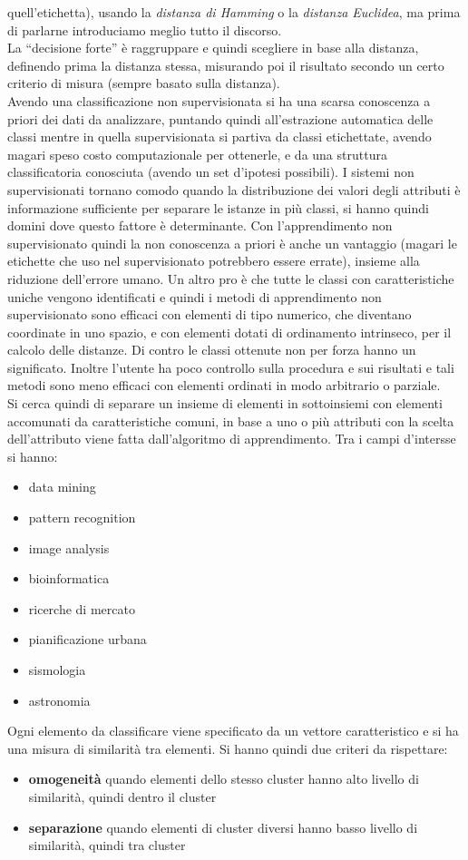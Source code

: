 quell'etichetta), usando la \textit{distanza di Hamming} o la \textit{distanza
  Euclidea}, ma prima di parlarne introduciamo meglio tutto il discorso. \\
La ``decisione forte'' è raggruppare e quindi scegliere in base alla distanza,
definendo prima la distanza stessa, misurando poi il risultato secondo un certo
criterio di misura (sempre basato sulla distanza).\\
Avendo una classificazione non supervisionata si ha una scarsa conoscenza a
priori dei dati da analizzare, puntando quindi all'estrazione automatica delle
classi mentre in quella supervisionata si partiva da classi etichettate, avendo
magari speso costo computazionale per ottenerle, e da una struttura
classificatoria conosciuta (avendo un set d'ipotesi possibili). I sistemi non
supervisionati tornano comodo quando la distribuzione dei valori degli attributi
è informazione sufficiente per separare le istanze in più classi, si hanno
quindi domini dove questo fattore è determinante. Con l'apprendimento non
supervisionato quindi la non conoscenza a priori è anche un vantaggio (magari le
etichette che uso nel supervisionato potrebbero essere errate), insieme
alla riduzione dell'errore umano. Un altro pro è che tutte le classi con
caratteristiche uniche vengono identificati e quindi i metodi di apprendimento
non supervisionato sono efficaci con elementi di tipo numerico, che diventano
coordinate in uno spazio, e con elementi dotati di ordinamento intrinseco, per
il calcolo delle distanze. Di contro le classi ottenute non per forza hanno un
significato. Inoltre l'utente ha poco controllo sulla procedura e sui risultati
e tali metodi sono meno efficaci con elementi ordinati in modo arbitrario o
parziale. \\
Si cerca quindi di separare un insieme di elementi in sottoinsiemi con elementi
accomunati da caratteristiche comuni, in base a uno o più attributi con la
scelta dell'attributo viene fatta dall'algoritmo di apprendimento. Tra i campi
d'intersse si hanno:
\begin{itemize}
  \item data mining
  \item pattern recognition
  \item image analysis 
  \item bioinformatica 
  \item ricerche di mercato
  \item pianificazione urbana 
  \item sismologia 
  \item astronomia
\end{itemize}
Ogni elemento da classificare viene specificato da un vettore caratteristico e
si ha una misura di similarità tra elementi. Si hanno quindi due criteri da 
rispettare:
\begin{itemize}
  \item \textbf{omogeneità} quando elementi dello stesso cluster hanno alto
  livello di similarità, quindi dentro il cluster
  \item \textbf{separazione} quando elementi di cluster diversi hanno basso
  livello di similarità, quindi tra cluster
\end{itemize}
